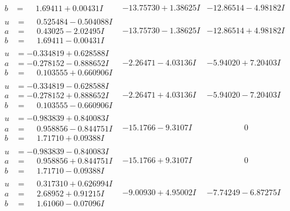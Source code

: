 \documentclass[1p]{elsarticle_modified}
\theoremstyle{definition}
\begin{document}
$$\begin{array}{c|c|c}
\begin{aligned}
b &= \phantom{-}1.69411 + 0.00431 I\end{aligned}
 & -13.75730 + 1.38625 I & -12.86514 - 4.98182 I \\ \hline\begin{aligned}
u &= \phantom{-}0.525484 - 0.504088 I \\
a &= \phantom{-}0.43025 - 2.02495 I \\
b &= \phantom{-}1.69411 - 0.00431 I\end{aligned}
 & -13.75730 - 1.38625 I & -12.86514 + 4.98182 I \\ \hline\begin{aligned}
u &= -0.334819 + 0.628588 I \\
a &= -0.278152 - 0.888652 I \\
b &= \phantom{-}0.103555 + 0.660906 I\end{aligned}
 & -2.26471 - 4.03136 I & -5.94020 + 7.20403 I \\ \hline\begin{aligned}
u &= -0.334819 - 0.628588 I \\
a &= -0.278152 + 0.888652 I \\
b &= \phantom{-}0.103555 - 0.660906 I\end{aligned}
 & -2.26471 + 4.03136 I & -5.94020 - 7.20403 I \\ \hline\begin{aligned}
u &= -0.983839 + 0.840083 I \\
a &= \phantom{-}0.958856 - 0.844751 I \\
b &= \phantom{-}1.71710 + 0.09388 I\end{aligned}
 & -15.1766 - 9.3107 I & \phantom{-0.000000 } 0 \\ \hline\begin{aligned}
u &= -0.983839 - 0.840083 I \\
a &= \phantom{-}0.958856 + 0.844751 I \\
b &= \phantom{-}1.71710 - 0.09388 I\end{aligned}
 & -15.1766 + 9.3107 I & \phantom{-0.000000 } 0 \\ \hline\begin{aligned}
u &= \phantom{-}0.317310 + 0.626994 I \\
a &= \phantom{-}2.68952 + 0.91215 I \\
b &= \phantom{-}1.61060 - 0.07096 I\end{aligned}
 & -9.00930 + 4.95002 I & -7.74249 - 6.87275 I \\ \hline\begin{aligned}

\end{aligned}
\end{array}$$
\end{document}

